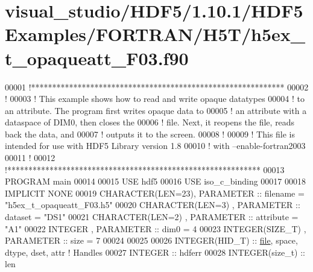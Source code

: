 \hypertarget{visual__studio_2_h_d_f5_21_810_81_2_h_d_f5_examples_2_f_o_r_t_r_a_n_2_h5_t_2h5ex__t__opaqueatt___f03_8f90_source}{}\section{visual\+\_\+studio/\+H\+D\+F5/1.10.1/\+H\+D\+F5\+Examples/\+F\+O\+R\+T\+R\+A\+N/\+H5\+T/h5ex\+\_\+t\+\_\+opaqueatt\+\_\+\+F03.f90}
\label{visual__studio_2_h_d_f5_21_810_81_2_h_d_f5_examples_2_f_o_r_t_r_a_n_2_h5_t_2h5ex__t__opaqueatt___f03_8f90_source}

\begin{DoxyCode}
00001 \textcolor{comment}{!************************************************************}
00002 \textcolor{comment}{!}
00003 \textcolor{comment}{!  This example shows how to read and write opaque datatypes}
00004 \textcolor{comment}{!  to an attribute.  The program first writes opaque data to}
00005 \textcolor{comment}{!  an attribute with a dataspace of DIM0, then closes the}
00006 \textcolor{comment}{!  file. Next, it reopens the file, reads back the data, and}
00007 \textcolor{comment}{!  outputs it to the screen.}
00008 \textcolor{comment}{!}
00009 \textcolor{comment}{!  This file is intended for use with HDF5 Library version 1.8}
00010 \textcolor{comment}{!  with --enable-fortran2003}
00011 \textcolor{comment}{!}
00012 \textcolor{comment}{!************************************************************}
00013 \textcolor{keyword}{PROGRAM} main
00014 
00015   \textcolor{keywordtype}{USE }hdf5
00016   \textcolor{keywordtype}{USE }iso\_c\_binding
00017 
00018   \textcolor{keywordtype}{IMPLICIT NONE}
00019   \textcolor{keywordtype}{CHARACTER(LEN=23)}, \textcolor{keywordtype}{PARAMETER} :: filename  = \textcolor{stringliteral}{"h5ex\_t\_opaqueatt\_F03.h5"}
00020   \textcolor{keywordtype}{CHARACTER(LEN=3)} , \textcolor{keywordtype}{PARAMETER} :: dataset   = \textcolor{stringliteral}{"DS1"}
00021   \textcolor{keywordtype}{CHARACTER(LEN=2)} , \textcolor{keywordtype}{PARAMETER} :: attribute = \textcolor{stringliteral}{"A1"}
00022   \textcolor{keywordtype}{INTEGER}          , \textcolor{keywordtype}{PARAMETER} :: dim0      = 4
00023   \textcolor{keywordtype}{INTEGER(SIZE\_T)}  , \textcolor{keywordtype}{PARAMETER} :: size      = 7
00024   
00025 
00026   \textcolor{keywordtype}{INTEGER(HID\_T)}  :: \hyperlink{structfile}{file}, space, dtype, dset, attr \textcolor{comment}{! Handles}
00027   \textcolor{keywordtype}{INTEGER} :: hdferr
00028   \textcolor{keywordtype}{INTEGER(size\_t)} :: len

\end{DoxyCode}
